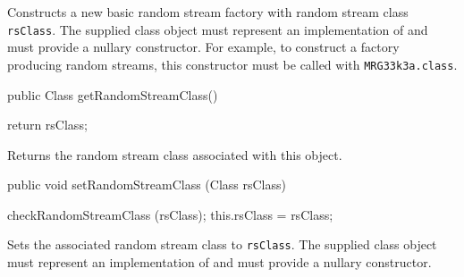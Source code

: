 \begin{tabb}  Constructs a new basic random stream factory with
 random stream class \texttt{rsClass}.
 The supplied class object must represent an implementation
 of  and must provide a nullary
 constructor.  For example, to construct a factory
 producing  random streams, this constructor
 must be called with \texttt{MRG33k3a.class}.
\end{tabb}
\begin{htmlonly}
\end{htmlonly}
\begin{code}

   public Class getRandomStreamClass()\begin{hide} {
      return rsClass;
   }\end{hide}
\end{code}
\begin{tabb}   Returns the random stream class associated with this
 object.
\end{tabb}
\begin{htmlonly}
\end{htmlonly}
\begin{code}

   public void setRandomStreamClass (Class rsClass)\begin{hide} {
      checkRandomStreamClass (rsClass);
      this.rsClass = rsClass;
   }\end{hide}
\end{code}
\begin{tabb}   Sets the associated random stream class to
 \texttt{rsClass}.
 The supplied class object must represent an implementation
 of  and must provide a nullary
 constructor.
\end{tabb}
\begin{htmlonly}
\end{htmlonly}
